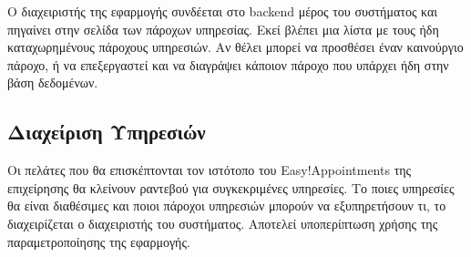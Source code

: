 Ο διαχειριστής της εφαρμογής συνδέεται στο backend μέρος του συστήματος και πηγαίνει στην σελίδα των πάροχων υπηρεσίας. Εκεί βλέπει μια λίστα με τους ήδη καταχωρημένους πάροχους υπηρεσιών. Αν θέλει μπορεί να προσθέσει έναν καινούργιο πάροχο, ή να επεξεργαστεί και να διαγράψει κάποιον πάροχο που υπάρχει ήδη στην βάση δεδομένων.

\subsection {Διαχείριση Υπηρεσιών}
Οι πελάτες που θα επισκέπτονται τον ιστότοπο του Easy!Appointments της επιχείρησης θα κλείνουν ραντεβού για συγκεκριμένες υπηρεσίες. Το ποιες υπηρεσίες θα είναι διαθέσιμες και ποιοι πάροχοι υπηρεσιών μπορούν να εξυπηρετήσουν τι, το διαχειρίζεται ο διαχειριστής του συστήματος. Αποτελεί υποπερίπτωση χρήσης της παραμετροποίησης της εφαρμογής.